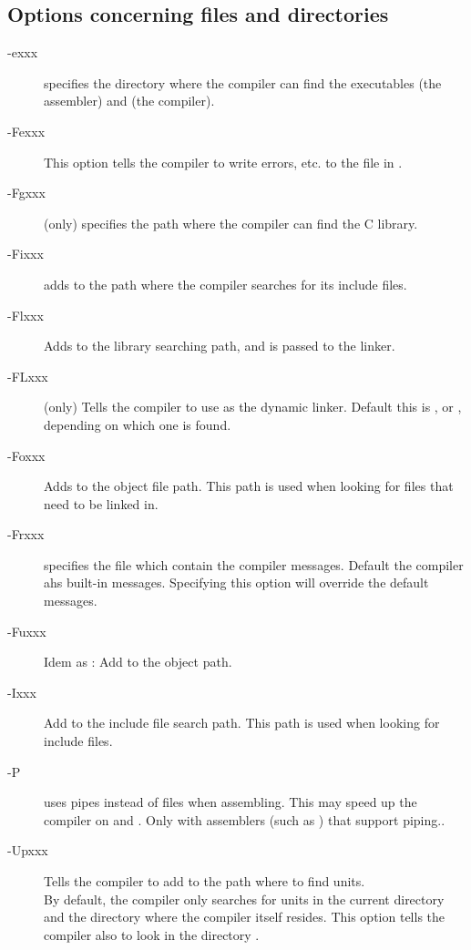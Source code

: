 \documentclass{report}
\newcommand{\olabel}[1]{\label{option:#1}}
\begin{document}
\subsection{Options concerning files and directories}
\begin{description}
\item [-exxx]  specifies the directory where the 
compiler can find the executables  (the assembler) and  (the
compiler).
\olabel{e}
\item [-Fexxx] This option tells the compiler to write errors, etc. to 
the file in .
\olabel{Fe} 
\item [-Fgxxx] (\linux only)  specifies the path where the compiler
can find the \gnu C library.
\olabel{Fg}
\item [-Fixxx] adds  to the path where the compiler searches for
its include files.
\olabel{Fi}
\item [-Flxxx] Adds  to the library searching path, and is passed
to the linker.
\olabel{Fl}
\item[-FLxxx] (\linux only) Tells the compiler to use  as the
dynamic linker. Default this is , or
, depending on which one is found.
\olabel{FL}
\item[-Foxxx] Adds  to the object file path. This path is used
when looking for files that need to be linked in.
\olabel{Fo} 
\item [-Frxxx]  specifies the file which contain the compiler
messages. Default the compiler ahs built-in messages. Specifying this option
will override the default messages.
\olabel{Fr}
\item [-Fuxxx] Idem as : Add  to the object path.
\olabel{Fu}
\item [-Ixxx] \olabel{I} Add  to the include file search path.
This path is used when looking for include files.
\item [-P] uses pipes instead of files when assembling. This may speed up
the compiler on \ostwo and \linux. Only with assemblers (such as \gnu
{}) that support piping..
\item [-Upxxx] \olabel{Up} Tells the compiler to add  to the path where to find
units. \\
By default, the compiler only searches for units in the current directory 
and the directory where the compiler itself resides. This option tells the
compiler also to look in the directory .
\end{description}
\end{document}
